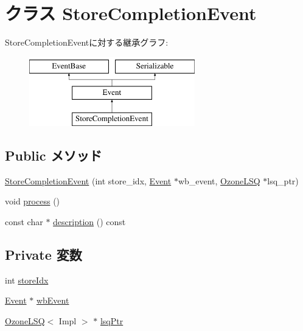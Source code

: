 \hypertarget{classOzoneLSQ_1_1StoreCompletionEvent}{
\section{クラス StoreCompletionEvent}
\label{classOzoneLSQ_1_1StoreCompletionEvent}
}
StoreCompletionEventに対する継承グラフ:\begin{figure}[H]
\begin{center}
\leavevmode
\includegraphics[height=3cm]{classOzoneLSQ_1_1StoreCompletionEvent}
\end{center}
\end{figure}
\subsection*{Public メソッド}
\begin{DoxyCompactItemize}
\item 
\hyperlink{classOzoneLSQ_1_1StoreCompletionEvent_a1f921e0941fd6fe4715ce8a68e1354a2}{StoreCompletionEvent} (int store\_\-idx, \hyperlink{classEvent}{Event} $\ast$wb\_\-event, \hyperlink{classOzoneLSQ}{OzoneLSQ} $\ast$lsq\_\-ptr)
\item 
void \hyperlink{classOzoneLSQ_1_1StoreCompletionEvent_a2e9c5136d19b1a95fc427e0852deab5c}{process} ()
\item 
const char $\ast$ \hyperlink{classOzoneLSQ_1_1StoreCompletionEvent_a5a14fe478e2393ff51f02e9b7be27e00}{description} () const 
\end{DoxyCompactItemize}
\subsection*{Private 変数}
\begin{DoxyCompactItemize}
\item 
int \hyperlink{classOzoneLSQ_1_1StoreCompletionEvent_a57382c4b905ebe92d67d0675cf257dad}{storeIdx}
\item 
\hyperlink{classEvent}{Event} $\ast$ \hyperlink{classOzoneLSQ_1_1StoreCompletionEvent_a3adecc4b1215c9d4f4d6b9f9f62d7c1c}{wbEvent}
\item 
\hyperlink{classOzoneLSQ}{OzoneLSQ}$<$ Impl $>$ $\ast$ \hyperlink{classOzoneLSQ_1_1StoreCompletionEvent_aa33578af3999e3e09c82021edd469a25}{lsqPtr}
\end{DoxyCompactItemize}

